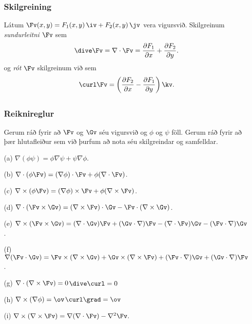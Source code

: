 \subsubsection{Skilgreining \rtask{}}
 Látum
$\Fv(x,y)=F_1(x,y)\,\iv+F_2(x,y)\,\jv$ vera vigursvið.  Skilgreinum
{\em sundurleitni} $\Fv$ sem  
$$\dive\Fv=\nabla\cdot\Fv=\frac{\partial F_1}{\partial
  x}+\frac{\partial F_2}{\partial y}.$$ 
og {\em rót} $\Fv$ skilgreinum við sem 
$$\curl\Fv=\bigg(\frac{\partial F_2}{\partial x}-\frac{\partial
  F_1}{\partial y}\bigg)\,\kv.$$ 







\subsection{} 

\subsubsection{Reiknireglur \rtask{}}
  Gerum ráð fyrir að $\Fv$ og $\Gv$ séu
vigursvið og $\phi$ og $\psi$ föll.  Gerum ráð fyrir að þær
hlutafleiður sem við þurfum að nota séu skilgreindar og samfelldar. 

(a) $\nabla(\phi\psi)=\phi\nabla\psi+\psi\nabla\phi$.

(b)  $\nabla\cdot(\phi\Fv)=(\nabla\phi)\cdot\Fv+\phi(\nabla\cdot\Fv)$.

(c) $\nabla\times(\phi\Fv)=(\nabla\phi)\times\Fv+\phi(\nabla\times\Fv)$. 

(d)  $\nabla\cdot(\Fv\times\Gv)=(\nabla\times\Fv)\cdot\Gv
-\Fv\cdot(\nabla\times\Gv)$.

(e) $\nabla\times(\Fv\times\Gv)=(\nabla\cdot\Gv)\Fv
+(\Gv\cdot\nabla)\Fv-(\nabla\cdot\Fv)\Gv-(\Fv\cdot\nabla)\Gv$.

(f) $\nabla(\Fv\cdot\Gv)=\Fv\times(\nabla\times \Gv)+\Gv\times(\nabla\times \Fv)+(\Fv\cdot\nabla)\Gv+(\Gv\cdot\nabla)\Fv$.

(g) $\nabla\cdot(\nabla\times \Fv)=0$\qquad\qquad$\dive\curl=0$

(h) $\nabla\times(\nabla\phi)=\ov$\qquad\qquad$\curl\grad=\ov$

(i)  $\nabla\times(\nabla\times \Fv)=\nabla(\nabla\cdot\Fv)-\nabla^2\Fv$.








\subsection{} 

